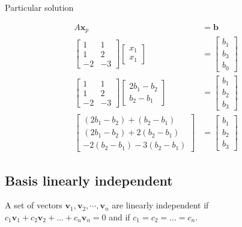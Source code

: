 \documentclass[main.tex]{subfiles}
\begin{document}
Particular solution

$$
\begin{aligned}
A \bm{x}_{p}&=\bm{b}\\
\left[\begin{array}{cc}
1 & 1 \\
1 & 2 \\
-2 & -3
\end{array}\right]\left[\begin{array}{l}
x_{1} \\
x_{1}
\end{array}\right]&=\left[\begin{array}{l}
b_{1} \\
b_{3} \\
b_{0}
\end{array}\right]\\
\left[\begin{array}{cc}
1 & 1 \\
1 & 2 \\
-2 & -3
\end{array}\right]\left[\begin{array}{c}
2 b_{1}-b_{2} \\
b_{2}-b_{1}
\end{array}\right]&=\left[\begin{array}{l}
b_{1} \\
b_{2} \\
b_{3}
\end{array}\right]\\
\left[\begin{array}{c}
\left(2 b_{1}-b_{2}\right)+\left(b_{2}-b_{1}\right) \\
\left(2 b_{1}-b_{2}\right)+2\left(b_{2}-b_{1}\right) \\
-2\left(b_{2}-b_{1}\right)-3\left(b_{2}-b_{1}\right)
\end{array}\right]&=\left[\begin{array}{l}
b_{1} \\
b_{2} \\
b_{3}
\end{array}\right]
\end{aligned}
$$

\subsection{Basis linearly independent}

A set of vectors $\bm{v}_{1}, \bm{v}_{2}, \cdots, \bm{v}_n$ are linearly independent if $c_{1} \bm{v}_{1} + c_{2} \bm{v}_{2} + \ldots + c_{n} \bm{v}_{n}=0$ and if $c_{1}=c_{2}=\ldots=c_{n}$.
\end{document}
